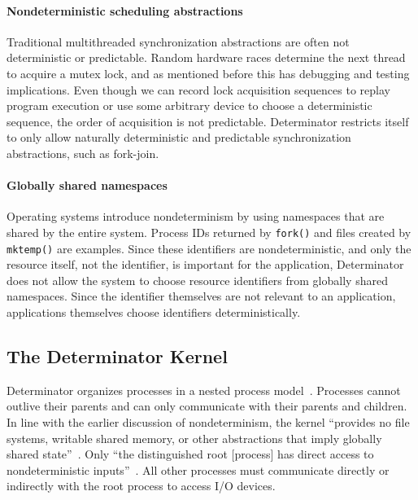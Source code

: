 \paragraph{Nondeterministic scheduling abstractions}
Traditional multithreaded synchronization abstractions are often not
deterministic or predictable. Random hardware races determine the next thread to
acquire a mutex lock, and as mentioned before this has debugging and testing
implications. Even though we can record lock acquisition sequences to replay
program execution or use some arbitrary device to choose a deterministic
sequence, the order of acquisition is not predictable. Determinator restricts
itself to only allow naturally deterministic and predictable synchronization
abstractions, such as fork-join.

\paragraph{Globally shared namespaces}
Operating systems introduce nondeterminism by using namespaces that are shared
by the entire system. Process IDs returned by {\tt fork()} and files created
by {\tt mktemp()} are examples. Since these identifiers are nondeterministic,
and only the resource itself, not the identifier, is important for the
application, Determinator does not allow the system to choose resource
identifiers from globally shared namespaces. Since the identifier themselves
are not relevant to an application, applications themselves choose identifiers
deterministically.

\subsection{The Determinator Kernel}

Determinator organizes processes in a nested process model~\cite{Ford96}.
Processes cannot outlive their parents and can only communicate with their
parents and children. In line with the earlier discussion of nondeterminism,
the kernel ``provides no file systems, writable shared memory, or other
abstractions that imply globally shared state''~\cite{Aviram10}. Only ``the
distinguished root [process] has direct access to nondeterministic
inputs''~\cite{Aviram10}. All other processes must communicate directly or
indirectly with the root process to access I/O devices.

